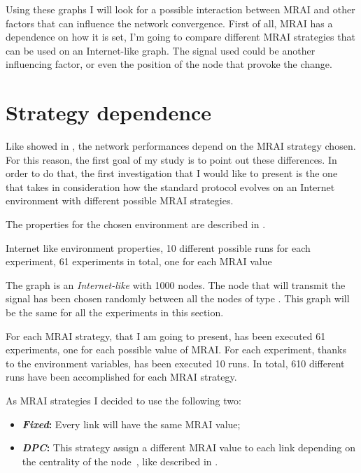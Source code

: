 Using these graphs I will look for a possible interaction between \ac{MRAI} and other
factors that can influence the network convergence.
First of all, \ac{MRAI} has a dependence on how it is set, I'm going to compare
different \ac{MRAI} strategies that can be used on an Internet-like graph.
The signal used could be another influencing factor, or even the position of
the node that provoke the change.

\section{Strategy dependence}
\label{sec:bgp_mrai_strategy_dependance}

Like showed in , the network performances depend
on the \ac{MRAI} strategy chosen.
For this reason, the first goal of my study is to point out these differences.
In order to do that, the first investigation that I would like to present is the one
that takes in consideration how the standard protocol evolves on an Internet environment
with different possible \ac{MRAI} strategies.

The properties for the chosen environment are described in .

\begin{table}[h]
	
		\caption{Internet like environment properties, \num{10} different possible
		runs for each experiment, \num{61} experiments in total, one for each
		\ac{MRAI} value}
	\label{tbl:internet_like_properties}
\end{table}

The graph is an \textit{Internet-like} with \num{1000} nodes.
The node that will transmit the signal has been chosen randomly between
all the nodes of type .
This graph will be the same for all the experiments in this section.

For each \ac{MRAI} strategy, that I am going to present, has been executed \num{61}
experiments, one for each possible value of \ac{MRAI}.
For each experiment, thanks to the environment variables, has been executed \num{10} runs.
In total, \num{610} different runs have been accomplished for each \ac{MRAI} strategy.

As \ac{MRAI} strategies I decided to use the following two:
\begin{itemize}
	\item \textbf{\textit{Fixed}:} Every link will have the same
		\ac{MRAI} value;
	\item \textbf{\textit{DPC}:} This strategy assign a different
		\ac{MRAI} value to each link depending on the centrality of the node~\cite{milani2020improving},
		like described in .
\end{itemize}


